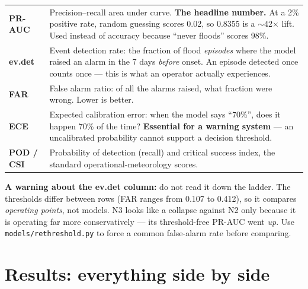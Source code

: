 \documentclass[11pt,a4paper]{article}
\begin{document}
\begin{table}[h]
\centering
\small
\begin{tabular}{@{}lp{11.2cm}@{}}
\toprule
\textbf{PR-AUC} & Precision--recall area under curve. \textbf{The headline
number.} At a 2\% positive rate, random guessing scores 0.02, so 0.8355 is a
$\sim$42$\times$ lift. Used instead of accuracy because ``never floods'' scores
98\%. \\[3pt]
\textbf{ev.det} & Event detection rate: the fraction of flood \emph{episodes}
where the model raised an alarm in the 7 days \emph{before} onset. An episode
detected once counts once --- this is what an operator actually experiences. \\[3pt]
\textbf{FAR} & False alarm ratio: of all the alarms raised, what fraction were
wrong. Lower is better. \\[3pt]
\textbf{ECE} & Expected calibration error: when the model says ``70\%'', does it
happen 70\% of the time? \textbf{Essential for a warning system} --- an
uncalibrated probability cannot support a decision threshold. \\[3pt]
\textbf{POD / CSI} & Probability of detection (recall) and critical success
index, the standard operational-meteorology scores. \\
\bottomrule
\end{tabular}
\end{table}

\noindent
\textbf{A warning about the ev.det column:} do not read it down the ladder. The
thresholds differ between rows (FAR ranges from 0.107 to 0.412), so it compares
\emph{operating points}, not models. N3 looks like a collapse against N2 only
because it is operating far more conservatively --- its threshold-free PR-AUC
went \emph{up}. Use \texttt{models/rethreshold.py} to force a common false-alarm
rate before comparing.

\section{Results: everything side by side}
\end{document}
